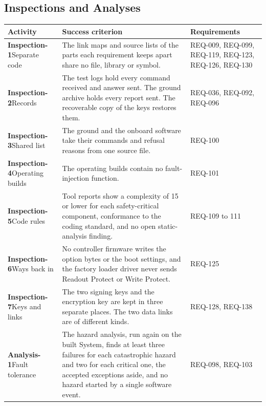 \documentclass[11pt,a4paper]{article}
\begin{document}
\subsection{Inspections and Analyses}
{\footnotesize
\begin{xltabular}{\textwidth}{@{}>{\raggedright\arraybackslash}p{3.0cm}>{\raggedright\arraybackslash}X>{\raggedright\arraybackslash}p{2.4cm}@{}}
\toprule
Activity & Success criterion & Requirements \\
\midrule
\endhead
\textbf{Inspection-1}\newline Separate code & The link maps and source lists of the parts each requirement keeps apart share no file, library or symbol. & REQ-009, REQ-099, REQ-119, REQ-123, REQ-126, REQ-130 \\
\textbf{Inspection-2}\newline Records & The test logs hold every command received and answer sent. The ground archive holds every report sent. The recoverable copy of the keys restores them. & REQ-036, REQ-092, REQ-096 \\
\textbf{Inspection-3}\newline Shared list & The ground and the onboard software take their commands and refusal reasons from one source file. & REQ-100 \\
\textbf{Inspection-4}\newline Operating builds & The operating builds contain no fault-injection function. & REQ-101 \\
\textbf{Inspection-5}\newline Code rules & Tool reports show a complexity of 15 or lower for each safety-critical component, conformance to the coding standard, and no open static-analysis finding. & REQ-109 to 111 \\
\textbf{Inspection-6}\newline Ways back in & No controller firmware writes the option bytes or the boot settings, and the factory loader driver never sends Readout Protect or Write Protect. & REQ-125 \\
\textbf{Inspection-7}\newline Keys and links & The two signing keys and the encryption key are kept in three separate places. The two data links are of different kinds. & REQ-128, REQ-138 \\
\textbf{Analysis-1}\newline Fault tolerance & The hazard analysis, run again on the built System, finds at least three failures for each catastrophic hazard and two for each critical one, the accepted exceptions aside, and no hazard started by a single software event. & REQ-098, REQ-103 \\

\end{xltabular}}
\end{document}
